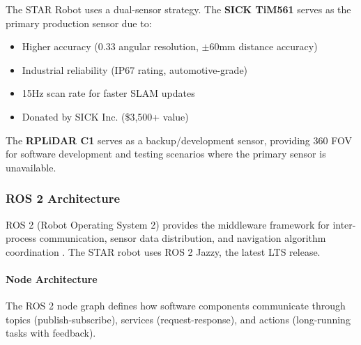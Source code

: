The STAR Robot uses a dual-sensor strategy. The \textbf{SICK TiM561} serves as the primary production sensor due to:
\begin{itemize}
    \item Higher accuracy (0.33\textdegree{} angular resolution, $\pm$60mm distance accuracy)
    \item Industrial reliability (IP67 rating, automotive-grade)
    \item 15Hz scan rate for faster SLAM updates
    \item Donated by SICK Inc. (\$3,500+ value)
\end{itemize}

The \textbf{RPLiDAR C1} serves as a backup/development sensor, providing 360\textdegree{} FOV for software development and testing scenarios where the primary sensor is unavailable.

\subsubsection{ROS 2 Architecture}

ROS 2 (Robot Operating System 2) provides the middleware framework for inter-process communication, sensor data distribution, and navigation algorithm coordination \parencite{ros2_documentation}. The STAR robot uses ROS 2 Jazzy, the latest LTS release.

\paragraph{Node Architecture}

The ROS 2 node graph defines how software components communicate through topics (publish-subscribe), services (request-response), and actions (long-running tasks with feedback).

